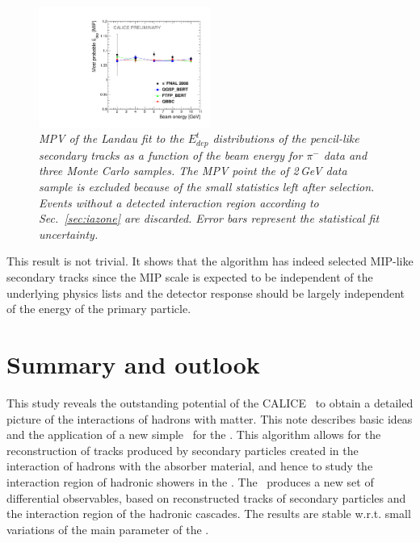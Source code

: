 \begin{figure}[H]
	\centering
	\includegraphics[width=0.5\textwidth]{ECAL/plots/calibrationfit-graph.pdf}
	\caption{\label{fig:calibrationgraph} \sl MPV of the Landau fit to the $E_{dep}^t$ distributions of the pencil-like secondary tracks as a function of the beam energy for $\pi^-$ data and three Monte Carlo samples. The MPV point the of 2\,GeV data sample is excluded because of the small statistics left after selection. Events without a detected interaction region  according to Sec.~\ref{sec:iazone} are discarded.  Error bars represent the statistical fit uncertainty.}
\end{figure}

This result is not trivial. It shows that the algorithm has indeed selected MIP-like secondary tracks since the MIP scale is expected to be independent of the underlying physics lists and the detector response should be largely independent of the energy of the primary particle. 

\section{Summary and outlook}

This study reveals the outstanding potential of the CALICE \ecalp\ to obtain a detailed picture of the interactions of hadrons with matter. 
This note describes basic ideas and the application of a new simple \tfa\ for the \ecal. This algorithm allows for the reconstruction of tracks produced by secondary particles created in the interaction of hadrons with the absorber material, and hence to study the interaction region of hadronic showers in the \ecal. The \tfa\ produces a new set of differential observables, based on reconstructed tracks of secondary particles and the interaction region of the hadronic cascades. The results are stable w.r.t. small variations of the main parameter of the \tfa.

